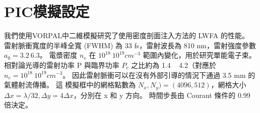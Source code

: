 \section{PIC模擬設定}
我們使用VORPAL中二維模擬研究了使用密度剖面注入方法的 LWFA 的性能。 雷射脈衝寬度的半峰全寬 (FWHM) 為 33 fs，雷射波長為 810 nm，雷射強度參數 \(a_0 = 3.2 ~ 6.3\)。 電漿密度 \(n_e\) 在 \(10^{18}~10^{19} cm^{-3}\) 範圍內變化，用於研究單能電子束。 相對論光導的雷射功率 P 與臨界功率 \(P_c\) 之比約為 1.4 ~ 4.2（對應於 \(n_e = 10^{18}~10^{19} cm^{-3}\)。 因此雷射脈衝可以在沒有外部引導的情況下通過 3.5 mm 的氣體射流傳播。 這
模擬框中的網格點數為 \(N_x, N_y) = (4096, 512)\)，網格大小 \(\Delta x =\lambda/32 , \Delta y = 4 \Delta x\)，分別在 x 和 y 方向。 時間步長由 Courant 條件的 0.99 倍決定。
